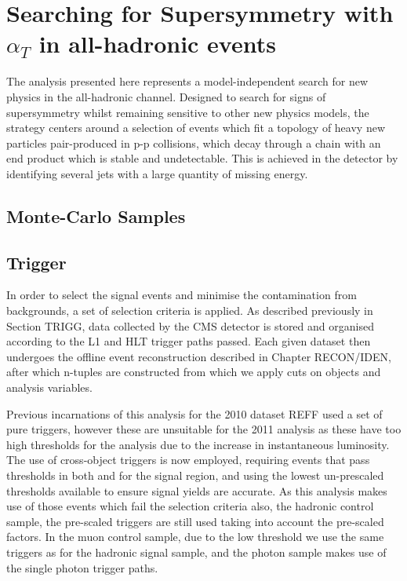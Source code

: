 \chapter{Searching for Supersymmetry with $\alpha_{T}$ in all-hadronic events}
The analysis presented here represents a model-independent search for new physics in the all-hadronic channel. Designed to search for signs of supersymmetry whilst remaining sensitive to other new physics models, the strategy centers around a selection of events which fit a topology of heavy new particles pair-produced in p-p collisions, which decay through a chain with an end product which is stable and undetectable. This is achieved in the detector by identifying several jets with a large quantity of missing energy. 



\section{Monte-Carlo Samples}



\section{Trigger}
In order to select the signal events and minimise the contamination from backgrounds, a set of selection criteria is applied. As described previously in Section TRIGG, data collected by the CMS detector is stored and organised according to the L1 and HLT trigger paths passed. Each given dataset then  undergoes the offline event reconstruction described in Chapter RECON/IDEN, after which n-tuples are constructed from which we apply cuts on objects and analysis variables. 

Previous incarnations of this analysis for the 2010 dataset REFF used a set of pure \HT triggers, however these are unsuitable for the 2011 analysis as these have too high thresholds for the analysis due to the increase in instantaneous luminosity. The use of cross-object triggers is now  employed, requiring events that pass thresholds in both \HT and \mht for the signal region, and using the lowest un-prescaled thresholds available to ensure signal yields are accurate. As this analysis makes use of those events which fail the selection criteria also, the hadronic control sample, the pre-scaled \HT triggers are still used taking into account the pre-scaled factors. In the muon control sample, due to the low \Pt threshold we use the same triggers as for the hadronic signal sample, and the photon sample makes use of the single photon trigger paths. 

